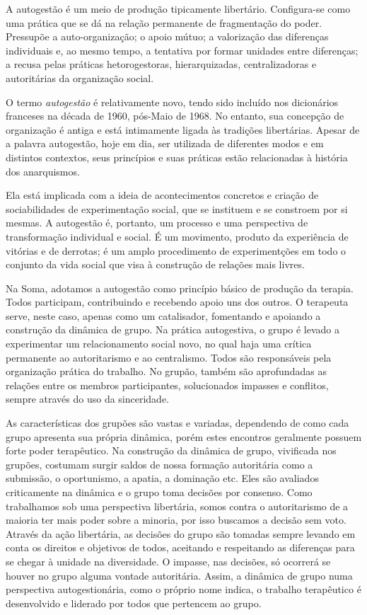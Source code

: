 A autogestão é um meio de produção tipicamente libertário. Configura-se
como uma prática que se dá na relação permanente de fragmentação do
poder. Pressupõe a auto-organização; o apoio mútuo; a valorização das
diferenças individuais e, ao mesmo tempo, a tentativa por formar
unidades entre diferenças; a recusa pelas práticas hetorogestoras,
hierarquizadas, centralizadoras e autoritárias da organização social.

O termo \emph{autogestão} é relativamente novo, tendo sido incluído nos
dicionários franceses na década de 1960, pós-Maio de 1968. No entanto,
sua concepção de organização é antiga e está intimamente ligada às
tradições libertárias. Apesar de a palavra autogestão, hoje em dia, ser
utilizada de diferentes modos e em distintos contextos, seus princípios
e suas práticas estão relacionadas à história dos anarquismos.

Ela está implicada com a ideia de acontecimentos concretos e criação de
sociabilidades de experimentação social, que se instituem e se constroem
por si mesmas. A autogestão é, portanto, um processo e uma perspectiva
de transformação individual e social. É um movimento, produto da
experiência de vitórias e de derrotas; é um amplo procedimento de
experimentções em todo o conjunto da vida social que visa à construção
de relações mais livres.

Na Soma, adotamos a autogestão como princípio básico de produção da
terapia. Todos participam, contribuindo e recebendo apoio uns dos
outros. O terapeuta serve, neste caso, apenas como um catalisador,
fomentando e apoiando a construção da dinâmica de grupo. Na prática
autogestiva, o grupo é levado a experimentar um relacionamento social
novo, no qual haja uma crítica permanente ao autoritarismo e ao
centralismo. Todos são responsáveis pela organização prática do
trabalho. No grupão, também são aprofundadas as relações entre os
membros participantes, solucionados impasses e conflitos, sempre através
do uso da sinceridade.

As características dos grupões são vastas e variadas, dependendo de como
cada grupo apresenta sua própria dinâmica, porém estes encontros
geralmente possuem forte poder terapêutico. Na construção da dinâmica de
grupo, vivificada nos grupões, costumam surgir saldos de nossa formação
autoritária como a submissão, o oportunismo, a apatia, a dominação etc.
Eles são avaliados criticamente na dinâmica e o grupo toma decisões por
consenso. Como trabalhamos sob uma perspectiva libertária, somos contra
o autoritarismo de a maioria ter mais poder sobre a minoria, por isso
buscamos a decisão sem voto. Através da ação libertária, as decisões do
grupo são tomadas sempre levando em conta os direitos e objetivos de
todos, aceitando e respeitando as diferenças para se chegar à unidade na
diversidade. O impasse, nas decisões, só ocorrerá se houver no grupo
alguma vontade autoritária. Assim, a dinâmica de grupo numa perspectiva
autogestionária, como o próprio nome indica, o trabalho terapêutico é
desenvolvido e liderado por todos que pertencem ao grupo.


